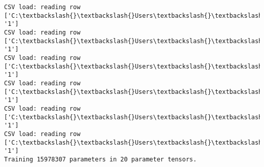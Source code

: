 \documentclass[11pt]{article}
\begin{document}
\begin{Verbatim}[commandchars=\\\{\}]
CSV load: reading row ['C:\textbackslash{}\textbackslash{}Users\textbackslash{}\textbackslash{}AbhishekGangadhar\textbackslash{}\textbackslash{}Downloads\textbackslash{}\textbackslash{}ActionRecog\textbackslash{}\textbackslash{}ActionRecog\textbackslash{}\textbackslash{}DataSets\textbackslash{}\textbackslash{}UCF11\textbackslash{}\textbackslash{}action\_youtube\_naudio\textbackslash{}\textbackslash{}golf\_swing\textbackslash{}\textbackslash{}v\_golf\_20\textbackslash{}\textbackslash{}v\_golf\_20\_02.avi', '1']
CSV load: reading row ['C:\textbackslash{}\textbackslash{}Users\textbackslash{}\textbackslash{}AbhishekGangadhar\textbackslash{}\textbackslash{}Downloads\textbackslash{}\textbackslash{}ActionRecog\textbackslash{}\textbackslash{}ActionRecog\textbackslash{}\textbackslash{}DataSets\textbackslash{}\textbackslash{}UCF11\textbackslash{}\textbackslash{}action\_youtube\_naudio\textbackslash{}\textbackslash{}golf\_swing\textbackslash{}\textbackslash{}v\_golf\_20\textbackslash{}\textbackslash{}v\_golf\_20\_03.avi', '1']
CSV load: reading row ['C:\textbackslash{}\textbackslash{}Users\textbackslash{}\textbackslash{}AbhishekGangadhar\textbackslash{}\textbackslash{}Downloads\textbackslash{}\textbackslash{}ActionRecog\textbackslash{}\textbackslash{}ActionRecog\textbackslash{}\textbackslash{}DataSets\textbackslash{}\textbackslash{}UCF11\textbackslash{}\textbackslash{}action\_youtube\_naudio\textbackslash{}\textbackslash{}golf\_swing\textbackslash{}\textbackslash{}v\_golf\_20\textbackslash{}\textbackslash{}v\_golf\_20\_04.avi', '1']
CSV load: reading row ['C:\textbackslash{}\textbackslash{}Users\textbackslash{}\textbackslash{}AbhishekGangadhar\textbackslash{}\textbackslash{}Downloads\textbackslash{}\textbackslash{}ActionRecog\textbackslash{}\textbackslash{}ActionRecog\textbackslash{}\textbackslash{}DataSets\textbackslash{}\textbackslash{}UCF11\textbackslash{}\textbackslash{}action\_youtube\_naudio\textbackslash{}\textbackslash{}golf\_swing\textbackslash{}\textbackslash{}v\_golf\_20\textbackslash{}\textbackslash{}v\_golf\_20\_05.avi', '1']
CSV load: reading row ['C:\textbackslash{}\textbackslash{}Users\textbackslash{}\textbackslash{}AbhishekGangadhar\textbackslash{}\textbackslash{}Downloads\textbackslash{}\textbackslash{}ActionRecog\textbackslash{}\textbackslash{}ActionRecog\textbackslash{}\textbackslash{}DataSets\textbackslash{}\textbackslash{}UCF11\textbackslash{}\textbackslash{}action\_youtube\_naudio\textbackslash{}\textbackslash{}golf\_swing\textbackslash{}\textbackslash{}v\_golf\_20\textbackslash{}\textbackslash{}v\_golf\_20\_06.avi', '1']
CSV load: reading row ['C:\textbackslash{}\textbackslash{}Users\textbackslash{}\textbackslash{}AbhishekGangadhar\textbackslash{}\textbackslash{}Downloads\textbackslash{}\textbackslash{}ActionRecog\textbackslash{}\textbackslash{}ActionRecog\textbackslash{}\textbackslash{}DataSets\textbackslash{}\textbackslash{}UCF11\textbackslash{}\textbackslash{}action\_youtube\_naudio\textbackslash{}\textbackslash{}golf\_swing\textbackslash{}\textbackslash{}v\_golf\_20\textbackslash{}\textbackslash{}v\_golf\_20\_07.avi', '1']
Training 15978307 parameters in 20 parameter tensors.


\end{Verbatim}
\end{document}
